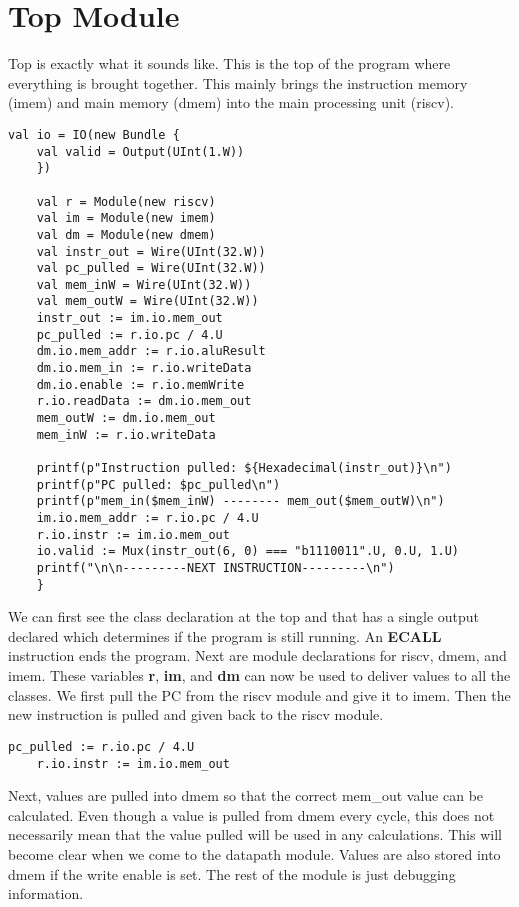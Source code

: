 \documentclass[12pt, letterpaper]{report}
\begin{document}
\section{Top Module}
Top is exactly what it sounds like. This is the top of the program where everything is brought together. This mainly brings the instruction
memory (imem) and main memory (dmem) into the main processing unit (riscv).

\begin{lstlisting}[style=scala]
    val io = IO(new Bundle {
    val valid = Output(UInt(1.W))
    })
    
    val r = Module(new riscv)
    val im = Module(new imem)
    val dm = Module(new dmem)
    val instr_out = Wire(UInt(32.W))
    val pc_pulled = Wire(UInt(32.W))
    val mem_inW = Wire(UInt(32.W))
    val mem_outW = Wire(UInt(32.W))
    instr_out := im.io.mem_out
    pc_pulled := r.io.pc / 4.U
    dm.io.mem_addr := r.io.aluResult
    dm.io.mem_in := r.io.writeData
    dm.io.enable := r.io.memWrite
    r.io.readData := dm.io.mem_out
    mem_outW := dm.io.mem_out
    mem_inW := r.io.writeData
    
    printf(p"Instruction pulled: ${Hexadecimal(instr_out)}\n")
    printf(p"PC pulled: $pc_pulled\n")
    printf(p"mem_in($mem_inW) -------- mem_out($mem_outW)\n")
    im.io.mem_addr := r.io.pc / 4.U
    r.io.instr := im.io.mem_out
    io.valid := Mux(instr_out(6, 0) === "b1110011".U, 0.U, 1.U)
    printf("\n\n---------NEXT INSTRUCTION---------\n")
    }
\end{lstlisting}

We can first see the class declaration at the top and that has
a single output declared which determines if the program is still
running. An \textbf{ECALL} instruction ends the program.
Next are module declarations for riscv, dmem, and imem. These variables \textbf{r}, \textbf{im}, and \textbf{dm} can
now be used to deliver values to all the classes. We first pull the PC from the riscv module and give it to imem. Then 
the new instruction is pulled and given back to the riscv module. 

\begin{lstlisting}[style=scala]
    pc_pulled := r.io.pc / 4.U
    r.io.instr := im.io.mem_out
\end{lstlisting}

Next, values are pulled into dmem so that the correct mem\_out value can be calculated.
Even though a value is pulled from dmem every cycle, 
this does not necessarily mean that the value pulled will be used in any calculations. 
This will become clear when we come to the datapath module. Values are also stored into dmem if the write enable is set.
The rest of the module is just debugging information.
\end{document}
